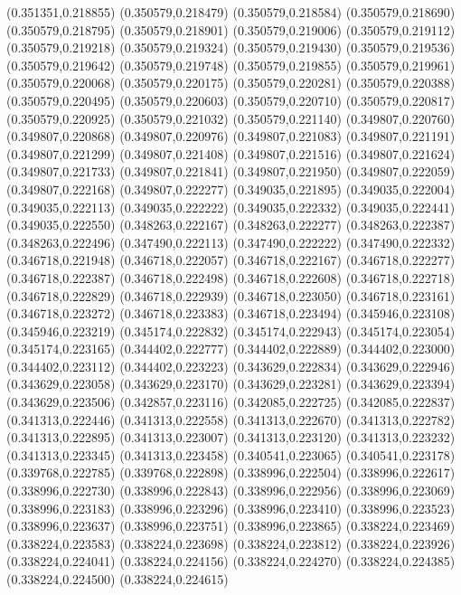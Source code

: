 (0.351351,0.218855)
(0.350579,0.218479)
(0.350579,0.218584)
(0.350579,0.218690)
(0.350579,0.218795)
(0.350579,0.218901)
(0.350579,0.219006)
(0.350579,0.219112)
(0.350579,0.219218)
(0.350579,0.219324)
(0.350579,0.219430)
(0.350579,0.219536)
(0.350579,0.219642)
(0.350579,0.219748)
(0.350579,0.219855)
(0.350579,0.219961)
(0.350579,0.220068)
(0.350579,0.220175)
(0.350579,0.220281)
(0.350579,0.220388)
(0.350579,0.220495)
(0.350579,0.220603)
(0.350579,0.220710)
(0.350579,0.220817)
(0.350579,0.220925)
(0.350579,0.221032)
(0.350579,0.221140)
(0.349807,0.220760)
(0.349807,0.220868)
(0.349807,0.220976)
(0.349807,0.221083)
(0.349807,0.221191)
(0.349807,0.221299)
(0.349807,0.221408)
(0.349807,0.221516)
(0.349807,0.221624)
(0.349807,0.221733)
(0.349807,0.221841)
(0.349807,0.221950)
(0.349807,0.222059)
(0.349807,0.222168)
(0.349807,0.222277)
(0.349035,0.221895)
(0.349035,0.222004)
(0.349035,0.222113)
(0.349035,0.222222)
(0.349035,0.222332)
(0.349035,0.222441)
(0.349035,0.222550)
(0.348263,0.222167)
(0.348263,0.222277)
(0.348263,0.222387)
(0.348263,0.222496)
(0.347490,0.222113)
(0.347490,0.222222)
(0.347490,0.222332)
(0.346718,0.221948)
(0.346718,0.222057)
(0.346718,0.222167)
(0.346718,0.222277)
(0.346718,0.222387)
(0.346718,0.222498)
(0.346718,0.222608)
(0.346718,0.222718)
(0.346718,0.222829)
(0.346718,0.222939)
(0.346718,0.223050)
(0.346718,0.223161)
(0.346718,0.223272)
(0.346718,0.223383)
(0.346718,0.223494)
(0.345946,0.223108)
(0.345946,0.223219)
(0.345174,0.222832)
(0.345174,0.222943)
(0.345174,0.223054)
(0.345174,0.223165)
(0.344402,0.222777)
(0.344402,0.222889)
(0.344402,0.223000)
(0.344402,0.223112)
(0.344402,0.223223)
(0.343629,0.222834)
(0.343629,0.222946)
(0.343629,0.223058)
(0.343629,0.223170)
(0.343629,0.223281)
(0.343629,0.223394)
(0.343629,0.223506)
(0.342857,0.223116)
(0.342085,0.222725)
(0.342085,0.222837)
(0.341313,0.222446)
(0.341313,0.222558)
(0.341313,0.222670)
(0.341313,0.222782)
(0.341313,0.222895)
(0.341313,0.223007)
(0.341313,0.223120)
(0.341313,0.223232)
(0.341313,0.223345)
(0.341313,0.223458)
(0.340541,0.223065)
(0.340541,0.223178)
(0.339768,0.222785)
(0.339768,0.222898)
(0.338996,0.222504)
(0.338996,0.222617)
(0.338996,0.222730)
(0.338996,0.222843)
(0.338996,0.222956)
(0.338996,0.223069)
(0.338996,0.223183)
(0.338996,0.223296)
(0.338996,0.223410)
(0.338996,0.223523)
(0.338996,0.223637)
(0.338996,0.223751)
(0.338996,0.223865)
(0.338224,0.223469)
(0.338224,0.223583)
(0.338224,0.223698)
(0.338224,0.223812)
(0.338224,0.223926)
(0.338224,0.224041)
(0.338224,0.224156)
(0.338224,0.224270)
(0.338224,0.224385)
(0.338224,0.224500)
(0.338224,0.224615)

